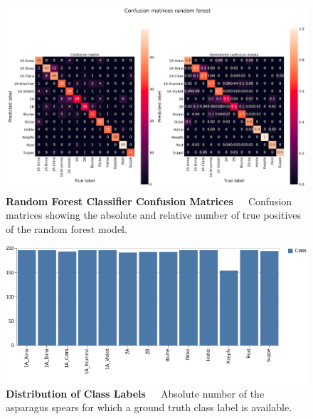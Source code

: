 \begin{figure}[!htb]
	\centering
	\includegraphics[scale=0.4]{Figures/chapter04/ftl_confusion_recall_random_forest.png}
	\decoRule
	\caption[Random Forest Classifier Confusion Matrices]{\textbf{Random Forest Classifier Confusion Matrices}~~~Confusion matrices showing the absolute and relative number of true positives of the random forest model.}
	\label{fig:FeatureToLabelRandomForest}
\end{figure}

\begin{figure}[!b]
	\centering
	\includegraphics[scale=0.55]{Figures/chapter04/ftl_visualization.png}
	\decoRule
	\caption[Distribution of Class Labels]{\textbf{Distribution of Class Labels}~~~Absolute number of the asparagus spears for which a ground truth class label is available.}
	\label{fig:FeatureToLabelVisualization}
\end{figure}


